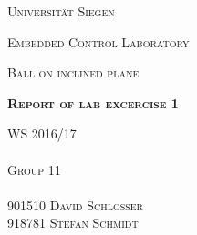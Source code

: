 \documentclass[12pt,a4paper]{article}
\begin{document}
\begin{titlepage}
	\begin{center}
	{\scshape\LARGE Universität Siegen \par}
	\vspace{3cm}
	{\scshape\LARGE Embedded Control Laboratory \par}
	\vspace{1cm}
	{\scshape\Large Ball on inclined plane \par}
	\vspace{5cm}
	{\scshape\Large\bfseries Report of lab excercise 1 \par}
	\vfill
	\end{center}
	{\scshape WS 2016/17\\ \\ Group 11\\ \\ 901510 David Schlosser\\ 918781 Stefan Schmidt \par}	
\end{titlepage}
\pagestyle{fancy}
\onehalfspacing
\tableofcontents
\newpage



\end{document}
